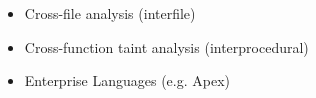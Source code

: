 \documentclass[preview]{standalone}
\begin{document}
\begin{center}
\begin{itemize}
                   \item Cross-file analysis (interfile)
                   \item Cross-function taint analysis (interprocedural)
                   \item Enterprise Languages (e.g. Apex)
                  \end{itemize}
\end{center}
\end{document}
